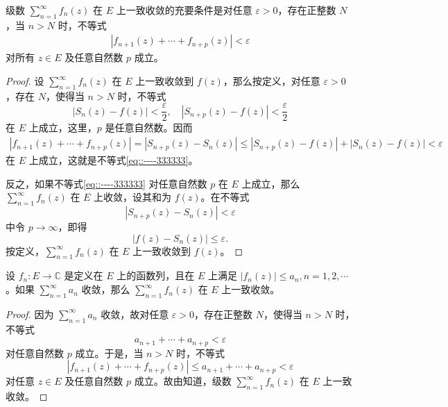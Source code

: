 \documentclass[../../main.tex]{subfiles}
\begin{document}
\begin{theorem}\label{theorem:定理4.1.2}
级数 \( \sum_{n=1}^{\infty} f_n(z) \) 在 \( E \) 上一致收敛的充要条件是对任意 \( \varepsilon > 0 \)，存在正整数 \( N \)，当 \( n > N \) 时，不等式
\begin{align}
|f_{n + 1}(z) + \cdots + f_{n + p}(z)| < \varepsilon\label{eq::----333333}
\end{align}
对所有 \( z \in E \) 及任意自然数 \( p \) 成立。
\end{theorem}
\begin{proof}
设 \( \sum_{n=1}^{\infty} f_n(z) \) 在 \( E \) 上一致收敛到 \( f(z) \)，那么按定义，对任意 \( \varepsilon > 0 \)，存在 \( N \)，使得当 \( n > N \) 时，不等式
\[
|S_n(z) - f(z)| < \frac{\varepsilon}{2},
\quad
|S_{n + p}(z) - f(z)| < \frac{\varepsilon}{2}
\]
在 \( E \) 上成立，这里，\( p \) 是任意自然数。因而
\begin{align*}
|f_{n + 1}(z) + \cdots + f_{n + p}(z)| = |S_{n + p}(z) - S_n(z)| \leqslant |S_{n + p}(z) - f(z)| + |S_n(z) - f(z)| < \varepsilon
\end{align*}
在 \( E \) 上成立，这就是不等式\eqref{eq::----333333}。

反之，如果不等式\eqref{eq::----333333} 对任意自然数 \( p \) 在 \( E \) 上成立，那么 \( \sum_{n=1}^{\infty} f_n(z) \) 在 \( E \) 上收敛，设其和为 \( f(z) \)。在不等式
\[
|S_{n + p}(z) - S_n(z)| < \varepsilon
\]
中令 \( p \to \infty \)，即得
\[
|f(z) - S_n(z)| \leqslant \varepsilon.
\]
按定义，\( \sum_{n=1}^{\infty} f_n(z) \) 在 \( E \) 上一致收敛到 \( f(z) \)。

\end{proof}

\begin{theorem}[Weierstrass一致收敛判别法]\label{theorem:Weierstrass一致收敛判别法}
设 \( f_n: E \to \mathbb{C} \) 是定义在 \( E \) 上的函数列，且在 \( E \) 上满足 \( |f_n(z)| \leqslant a_n, n = 1, 2, \cdots \)。如果 \( \sum_{n=1}^{\infty} a_n \) 收敛，那么 \( \sum_{n=1}^{\infty} f_n(z) \) 在 \( E \) 上一致收敛。
\end{theorem}
\begin{proof}
因为 \( \sum_{n=1}^{\infty} a_n \) 收敛，故对任意 \( \varepsilon > 0 \)，存在正整数 \( N \)，使得当 \( n > N \) 时，不等式
\[
a_{n + 1} + \cdots + a_{n + p} < \varepsilon
\]
对任意自然数 \( p \) 成立。于是，当 \( n > N \) 时，不等式
\[
|f_{n + 1}(z) + \cdots + f_{n + p}(z)| \leqslant a_{n + 1} + \cdots + a_{n + p}
< \varepsilon
\]
对任意 \( z \in E \) 及任意自然数 \( p \) 成立。故由知道，级数 \( \sum_{n=1}^{\infty} f_n(z) \) 在 \( E \) 上一致收敛。

\end{proof}
\end{document}
